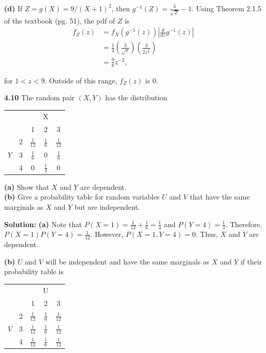 \documentclass{article}
\newcommand{\mybox}{%
    \collectbox{%
        \setlength{\fboxsep}{1pt}%
        \fbox{\BOXCONTENT}%
    }%
}
\begin{document}
\vspace{3mm}

\noindent\textbf{(d)}  If $Z=g(X)=9/(X+1)^2$, then $g^{-1}(Z) = \frac{3}{\sqrt{Z}} - 1.$  Using Theorem 2.1.5 of the textbook (pg. 51), the pdf of $Z$ is 
\begin{align}
f_Z(z) &= f_X(g^{-1}(z))\left| \frac{d}{dz} g^{-1}(z)\right| \\
&= \frac{1}{4}\left(\frac{3}{\sqrt{z}}\right)\left(\frac{3}{2z^{\frac{3}{2}}}\right) \\
&= \frac{9}{8}z^{-2},
\end{align}

\noindent for $1<z<9$.  Outside of this range, $f_Z(z)$ is $0$.  

\pagebreak

\noindent\mybox{\textbf{4.10}}  The random pair $(X,Y)$ has the distribution 

\begin{center}
\begin{tabular}{cc|ccc}
& & & X & \\
& & 1& 2& 3 \\
\hline
& 2 & $\frac{1}{12}$ & $\frac{1}{6}$ & $\frac{1}{12}$ \\
$Y$ & 3 & $\frac{1}{6}$ & 0 & $\frac{1}{6}$ \\
& 4 & 0 & $\frac{1}{3}$ & 0 
\end{tabular}
\end{center}

\noindent\textbf{(a)}  Show that $X$ and $Y$ are dependent. \\
\textbf{(b)}  Give a probability table for random variables $U$ and $V$ that have the same marginals as $X$ and $Y$ but are independent. 

\vspace{3mm}

\noindent\mybox{\textbf{Solution:}}  \textbf{(a)} Note that $P(X=1) = \frac{1}{12} + \frac{1}{6} = \frac{1}{4}$ and $P(Y=4) = \frac{1}{3}$.  Therefore, $P(X=1)P(Y=4) = \frac{1}{12}.$  However, $P(X=1, Y=4) = 0$.  Thus, $X$ and $Y$ are dependent.  

\vspace{3mm}

\noindent\textbf{(b)}  $U$ and $V$ will be independent and have the same marginals as $X$ and $Y$ if their probability table is 

\begin{center}
\begin{tabular}{cc|ccc}
& & & U & \\
& & 1& 2& 3 \\
\hline
& 2 & $\frac{1}{12}$ & $\frac{1}{6}$ & $\frac{1}{12}$ \\
$V$ & 3 & $\frac{1}{12}$ & $\frac{1}{6}$ & $\frac{1}{12}$ \\
& 4 & $\frac{1}{12}$ & $\frac{1}{6}$ & $\frac{1}{12}$
\end{tabular}
\end{center}
\end{document}
